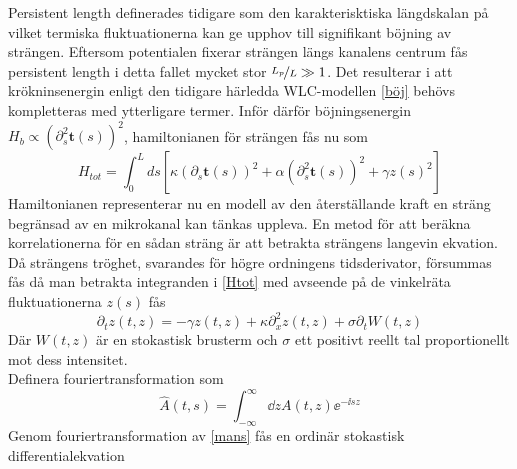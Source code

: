 Persistent length definerades tidigare som den karakterisktiska längdskalan på vilket termiska fluktuationerna kan ge upphov till signifikant böjning av strängen. Eftersom potentialen fixerar strängen längs kanalens centrum fås persistent length i detta fallet mycket stor $\nicefrac{L_{p}}{L}\gg 1$. Det resulterar i att krökninsenergin enligt den tidigare härledda WLC-modellen \eqref{böj} behövs kompletteras med ytterligare termer. Inför därför böjningsenergin $H_{b} \propto (\partial_{s}^{2}\mathbf{t}(s))^2$, hamiltonianen för strängen fås nu som
\begin{equation}
\label{Htot}
    H_{tot}=\int_{0}^{L}ds[\kappa(\partial_{s}\mathbf{t}(s))^2+\alpha(\partial_{s}^{2}\mathbf{t}(s))^2 + \gamma z(s)^2]
\end{equation}
Hamiltonianen representerar nu en modell av den återställande kraft en sträng begränsad av en mikrokanal kan tänkas uppleva. En metod för att beräkna korrelationerna för en sådan sträng är att betrakta strängens langevin ekvation. Då strängens tröghet, svarandes för högre ordningens tidsderivator, försummas fås då man betrakta integranden i \eqref{Htot} med avseende på de vinkelräta fluktuationerna $z(s)$ fås \cite{PhysRevE.60.4671}
\begin{equation}
\label{mans}
    \partial_{t}z(t,z)=-\gamma z(t,z)+\kappa \partial_{x}^{2}z(t,z)+\sigma \partial_{t}W(t,z)
\end{equation}
Där $W(t,z)$ är en stokastisk brusterm och $\sigma$ ett positivt reellt tal proportionellt mot dess intensitet.\\
Definera fouriertransformation som 
\begin{equation}
    \hat{A}(t,s)=\int_{-\infty}^{\infty}\dd{z} A(t,z)\ee^{-\ii sz}
\end{equation}
Genom fouriertransformation av \eqref{mans} fås en ordinär stokastisk differentialekvation
